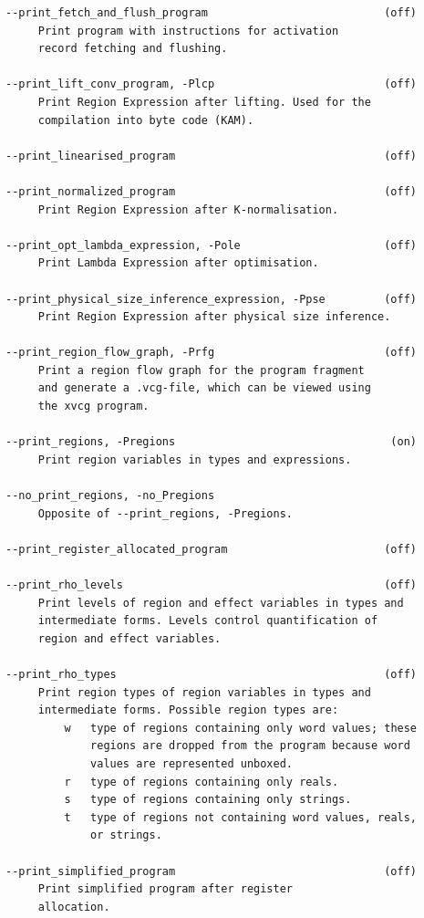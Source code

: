 \documentclass[12pt]{book}
\begin{document}
\begin{verbatim}
--print_fetch_and_flush_program                           (off)
     Print program with instructions for activation
     record fetching and flushing.

--print_lift_conv_program, -Plcp                          (off)
     Print Region Expression after lifting. Used for the
     compilation into byte code (KAM).

--print_linearised_program                                (off)

--print_normalized_program                                (off)
     Print Region Expression after K-normalisation.

--print_opt_lambda_expression, -Pole                      (off)
     Print Lambda Expression after optimisation.

--print_physical_size_inference_expression, -Ppse         (off)
     Print Region Expression after physical size inference.

--print_region_flow_graph, -Prfg                          (off)
     Print a region flow graph for the program fragment
     and generate a .vcg-file, which can be viewed using
     the xvcg program.

--print_regions, -Pregions                                 (on)
     Print region variables in types and expressions.

--no_print_regions, -no_Pregions
     Opposite of --print_regions, -Pregions.

--print_register_allocated_program                        (off)

--print_rho_levels                                        (off)
     Print levels of region and effect variables in types and
     intermediate forms. Levels control quantification of
     region and effect variables.

--print_rho_types                                         (off)
     Print region types of region variables in types and
     intermediate forms. Possible region types are:
         w   type of regions containing only word values; these
             regions are dropped from the program because word
             values are represented unboxed.
         r   type of regions containing only reals.
         s   type of regions containing only strings.
         t   type of regions not containing word values, reals,
             or strings.

--print_simplified_program                                (off)
     Print simplified program after register
     allocation.


\end{verbatim}
\end{document}

